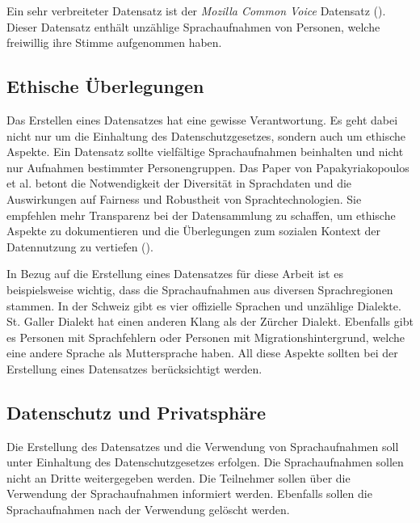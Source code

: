 \documentclass[11pt,a4paper]{article}
\begin{document}
\noindent \newline
Ein sehr verbreiteter Datensatz ist der \textit{Mozilla Common Voice} Datensatz
(\cite{ardila2020common}). Dieser Datensatz enthält unzählige Sprachaufnahmen von Personen, welche
freiwillig ihre Stimme aufgenommen haben. 

\subsection{Ethische Überlegungen}
Das Erstellen eines Datensatzes hat eine gewisse Verantwortung. Es geht dabei nicht nur um die 
Einhaltung des Datenschutzgesetzes, sondern auch um ethische Aspekte. Ein Datensatz sollte 
vielfältige Sprachaufnahmen beinhalten und nicht nur Aufnahmen bestimmter Personengruppen. Das 
Paper von Papakyriakopoulos et al. betont die Notwendigkeit der Diversität in Sprachdaten und die 
Auswirkungen auf Fairness und Robustheit von Sprachtechnologien. Sie empfehlen mehr Transparenz 
bei der Datensammlung zu schaffen, um ethische Aspekte zu dokumentieren und die Überlegungen zum 
sozialen Kontext der Datennutzung zu vertiefen (\cite{papakyriakopoulos2023augmented}).

\noindent \newline
In Bezug auf die Erstellung eines Datensatzes für diese Arbeit ist es beispielsweise wichtig, dass 
die Sprachaufnahmen aus diversen Sprachregionen stammen. In der Schweiz gibt es vier offizielle 
Sprachen und unzählige Dialekte. St. Galler Dialekt hat einen anderen Klang als der Zürcher Dialekt.
Ebenfalls gibt es Personen mit Sprachfehlern oder Personen mit Migrationshintergrund, welche eine andere Sprache als 
Muttersprache haben. All diese Aspekte sollten bei der Erstellung eines Datensatzes berücksichtigt 
werden.

\subsection{Datenschutz und Privatsphäre}
Die Erstellung des Datensatzes und die Verwendung von Sprachaufnahmen soll unter Einhaltung des 
Datenschutzgesetzes erfolgen. Die Sprachaufnahmen sollen nicht an Dritte weitergegeben werden. Die 
Teilnehmer sollen über die Verwendung der Sprachaufnahmen informiert werden. Ebenfalls sollen die 
Sprachaufnahmen nach der Verwendung gelöscht werden. 
\end{document}
